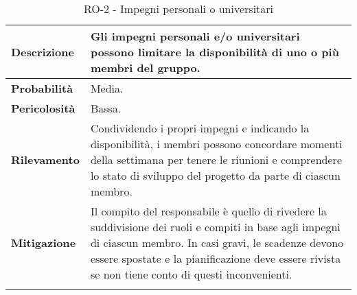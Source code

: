 \newpage


\begin{longtable}{ | l | p{12cm} | }
	\hline
	\textbf{Descrizione}  & Gli impegni personali e/o universitari possono limitare la disponibilità di uno o più membri del gruppo.                                                                                                                                                           \\
	\hline
	\textbf{Probabilità}  & Media.                                                                                                                                                                                                                                                             \\
	\hline
	\textbf{Pericolosità} & Bassa.                                                                                                                                                                                                                                                             \\
	\hline
	\textbf{Rilevamento}  & Condividendo i propri impegni e indicando la disponibilità, i membri possono concordare momenti della settimana per tenere le riunioni e comprendere lo stato di sviluppo del progetto da parte di ciascun membro.                                                 \\
	\hline
	\textbf{Mitigazione}  & Il compito del responsabile è quello di rivedere la suddivisione dei ruoli e compiti in base agli impegni di ciascun membro. In casi gravi, le scadenze devono essere spostate e la pianificazione deve essere rivista se non tiene conto di questi inconvenienti. \\
	\hline
	\caption{RO-2 - Impegni personali o universitari}
\end{longtable}


